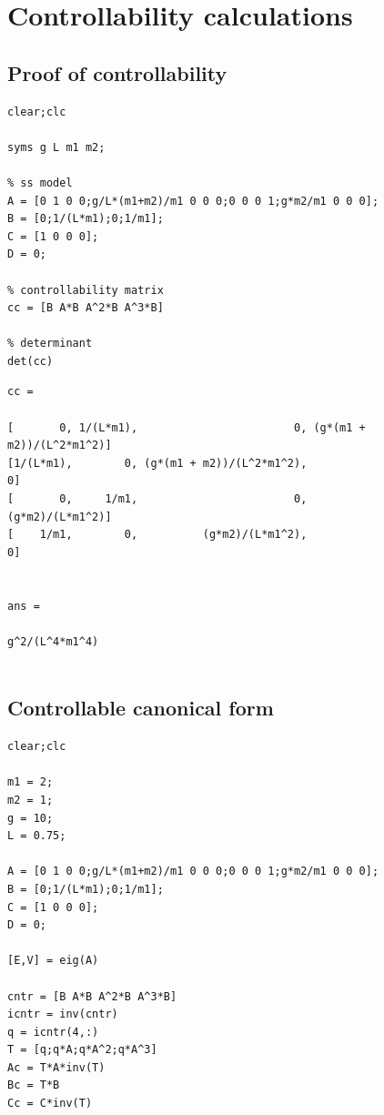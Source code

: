 \documentclass[12pt]{article}
\numberwithin{equation}{section}
\begin{document}
\section{Controllability calculations}

\subsection{Proof of controllability}
\label{app:controllability}

    \begin{verbatim}
clear;clc

syms g L m1 m2;

% ss model
A = [0 1 0 0;g/L*(m1+m2)/m1 0 0 0;0 0 0 1;g*m2/m1 0 0 0];
B = [0;1/(L*m1);0;1/m1];
C = [1 0 0 0];
D = 0;

% controllability matrix
cc = [B A*B A^2*B A^3*B]

% determinant
det(cc)
\end{verbatim}

        \color{lightgray} \begin{verbatim} 
cc =
 
[       0, 1/(L*m1),                        0, (g*(m1 + m2))/(L^2*m1^2)]
[1/(L*m1),        0, (g*(m1 + m2))/(L^2*m1^2),                        0]
[       0,     1/m1,                        0,          (g*m2)/(L*m1^2)]
[    1/m1,        0,          (g*m2)/(L*m1^2),                        0]
 
 
ans =
 
g^2/(L^4*m1^4)
 
\end{verbatim} \color{black}

\subsection{Controllable canonical form}
\label{app:ccf}
    \begin{verbatim}
clear;clc

m1 = 2;
m2 = 1;
g = 10;
L = 0.75;

A = [0 1 0 0;g/L*(m1+m2)/m1 0 0 0;0 0 0 1;g*m2/m1 0 0 0];
B = [0;1/(L*m1);0;1/m1];
C = [1 0 0 0];
D = 0;

[E,V] = eig(A)

cntr = [B A*B A^2*B A^3*B]
icntr = inv(cntr)
q = icntr(4,:)
T = [q;q*A;q*A^2;q*A^3]
Ac = T*A*inv(T)
Bc = T*B
Cc = C*inv(T)
\end{verbatim}
\end{document}
